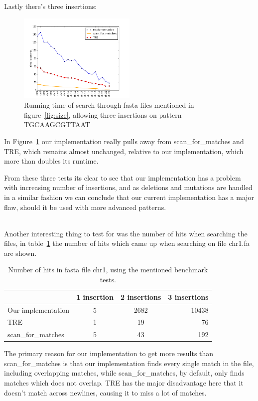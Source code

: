 Lastly there's three insertions:
\begin{figure}[h!]
\centering
\includegraphics[width=0.5\textwidth]{Benchmarking/3ins.png}
\caption{Running time of search through fasta files mentioned in figure~\ref{fig:size},  allowing three insertions on pattern TGCAAGCGTTAAT}
\label{fig:ins3}
\end{figure}

In Figure~\ref{fig:ins3} our implementation really pulls away from scan\_for\_matches and TRE, which remains almost unchanged, relative to our implementation, which more than doubles its runtime.


From these three tests its clear to see that our implementation has a problem with increasing number of insertions, and as deletions and mutations are handled in a similar fashion we can conclude that our current implementation has a major flaw, should it be used with more advanced patterns. 
\\
~

Another interesting thing to test for was the number of hits when searching the files, in table~\ref{tab:hits} the number of hits which came up when searching on file chr1.fa are shown.

\begin{table}[h!]
\centering
\begin{tabular}{ l | c c r }
& 1 insertion & 2 insertions & 3 insertions\\
\hline
Our implementation& 5 &  2682 & 10438 \\
TRE& 1 & 19 & 76 \\
scan\_for\_matches & 5 & 43  & 192 \\
\end{tabular}
\caption{Number of hits in fasta file chr1, using the mentioned benchmark tests.}
\label{tab:hits}
\end{table}

The primary reason for our implementation to get more results than scan\_for\_matches is that our implementation finds every single match in the file, including overlapping matches, while scan\_for\_matches, by default, only finds matches which does not overlap. TRE has the major disadvantage here that it doesn't match across newlines, causing it to miss a lot of matches.

